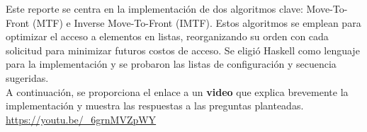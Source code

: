 Este reporte se centra en la implementación de dos algoritmos clave: Move-To-Front (MTF) e Inverse Move-To-Front (IMTF). Estos algoritmos se emplean para optimizar el acceso a elementos en listas, reorganizando su orden con cada solicitud para minimizar futuros costos de acceso. Se eligió Haskell como lenguaje para la implementación y se probaron las listas de configuración y secuencia sugeridas.\\

A continuación, se proporciona el enlace a un \textbf{video} que explica brevemente la implementación y muestra las respuestas a las preguntas planteadas. \url{https://youtu.be/_6grnMVZpWY}